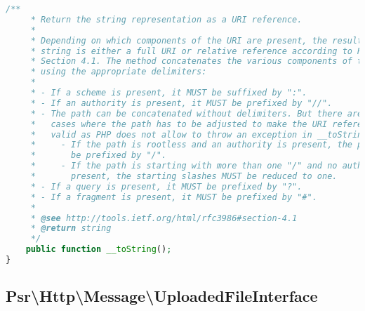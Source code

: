 \begin{lstlisting}[language=PHP]
    /**
     * Return the string representation as a URI reference.
     *
     * Depending on which components of the URI are present, the resulting
     * string is either a full URI or relative reference according to RFC 3986,
     * Section 4.1. The method concatenates the various components of the URI,
     * using the appropriate delimiters:
     *
     * - If a scheme is present, it MUST be suffixed by ":".
     * - If an authority is present, it MUST be prefixed by "//".
     * - The path can be concatenated without delimiters. But there are two
     *   cases where the path has to be adjusted to make the URI reference
     *   valid as PHP does not allow to throw an exception in __toString():
     *     - If the path is rootless and an authority is present, the path MUST
     *       be prefixed by "/".
     *     - If the path is starting with more than one "/" and no authority is
     *       present, the starting slashes MUST be reduced to one.
     * - If a query is present, it MUST be prefixed by "?".
     * - If a fragment is present, it MUST be prefixed by "#".
     *
     * @see http://tools.ietf.org/html/rfc3986#section-4.1
     * @return string
     */
    public function __toString();
}
\end{lstlisting}


\subsection{Psr\textbackslash Http\textbackslash Message\textbackslash UploadedFileInterface}



